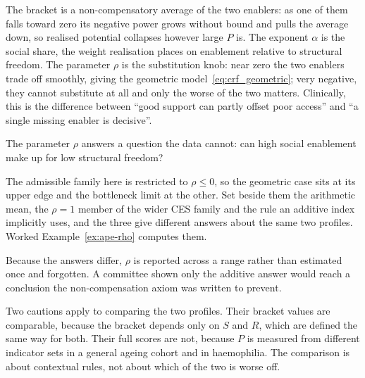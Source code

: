 \begin{reading}
The bracket is a non-compensatory average of the two enablers: as one of them falls
toward zero its negative power grows without bound and pulls the average down, so
realised potential collapses however large $P$ is. The exponent $\alpha$ is the
social share, the weight realisation places on enablement relative to structural
freedom. The parameter $\rho$ is the substitution knob: near zero the two enablers
trade off smoothly, giving the geometric model~\eqref{eq:crf_geometric}; very
negative, they cannot substitute at all and only the worse of the two matters.
Clinically, this is the difference between ``good support can partly offset poor
access'' and ``a single missing enabler is decisive''.
\end{reading}

\begin{reading}
The parameter $\rho$ answers a question the data cannot: can high social
enablement make up for low structural freedom?

The admissible family here is restricted to $\rho\leq0$, so the geometric case
sits at its upper edge and the bottleneck limit at the other. Set beside them
the arithmetic mean, the $\rho=1$ member of the wider CES family and the rule an
additive index implicitly uses, and the three give different answers about the
same two profiles. Worked Example~\ref{ex:ape-rho} computes them.

Because the answers differ, $\rho$ is reported across a range rather than
estimated once and forgotten. A committee shown only the additive answer would
reach a conclusion the non-compensation axiom was written to prevent.

Two cautions apply to comparing the two profiles. Their bracket values are
comparable, because the bracket depends only on $S$ and $R$, which are defined
the same way for both. Their full scores are not, because $P$ is measured from
different indicator sets in a general ageing cohort and in haemophilia. The
comparison is about contextual rules, not about which of the two is worse off.
\end{reading}

